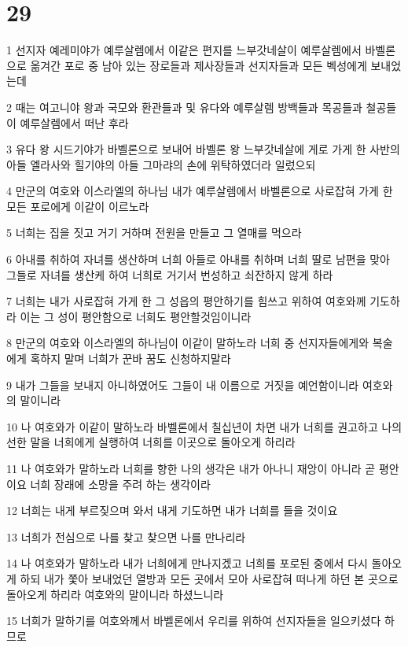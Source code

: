 \chapter{29}

\par 1 선지자 예레미야가 예루살렘에서 이같은 편지를 느부갓네살이 예루살렘에서 바벨론으로 옮겨간 포로 중 남아 있는 장로들과 제사장들과 선지자들과 모든 벡성에게 보내었는데
\par 2 때는 여고니야 왕과 국모와 환관들과 및 유다와 예루살렘 방백들과 목공들과 철공들이 예루살렘에서 떠난 후라
\par 3 유다 왕 시드기야가 바벨론으로 보내어 바벨론 왕 느부갓네살에 게로 가게 한 사반의 아들 엘라사와 힐기야의 아들 그마랴의 손에 위탁하였더라 일렀으되
\par 4 만군의 여호와 이스라엘의 하나님 내가 예루살렘에서 바벨론으로 사로잡혀 가게 한 모든 포로에게 이같이 이르노라
\par 5 너희는 집을 짓고 거기 거하며 전원을 만들고 그 열매를 먹으라
\par 6 아내를 취하여 자녀를 생산하며 너희 아들로 아내를 취하며 너희 딸로 남편을 맞아 그들로 자녀를 생산케 하여 너희로 거기서 번성하고 쇠잔하지 않게 하라
\par 7 너희는 내가 사로잡혀 가게 한 그 성읍의 평안하기를 힘쓰고 위하여 여호와께 기도하라 이는 그 성이 평안함으로 너희도 평안할것임이니라
\par 8 만군의 여호와 이스라엘의 하나님이 이같이 말하노라 너희 중 선지자들에게와 복술에게 혹하지 말며 너희가 꾼바 꿈도 신청하지말라
\par 9 내가 그들을 보내지 아니하였어도 그들이 내 이름으로 거짓을 예언함이니라 여호와의 말이니라
\par 10 나 여호와가 이같이 말하노라 바벨론에서 칠십년이 차면 내가 너희를 권고하고 나의 선한 말을 너희에게 실행하여 너희를 이곳으로 돌아오게 하리라
\par 11 나 여호와가 말하노라 너희를 향한 나의 생각은 내가 아나니 재앙이 아니라 곧 평안이요 너희 장래에 소망을 주려 하는 생각이라
\par 12 너희는 내게 부르짖으며 와서 내게 기도하면 내가 너희를 들을 것이요
\par 13 너희가 전심으로 나를 찾고 찾으면 나를 만나리라
\par 14 나 여호와가 말하노라 내가 너희에게 만나지겠고 너희를 포로된 중에서 다시 돌아오게 하되 내가 쫓아 보내었던 열방과 모든 곳에서 모아 사로잡혀 떠나게 하던 본 곳으로 돌아오게 하리라 여호와의 말이니라 하셨느니라
\par 15 너희가 말하기를 여호와께서 바벨론에서 우리를 위하여 선지자들을 일으키셨다 하므로
